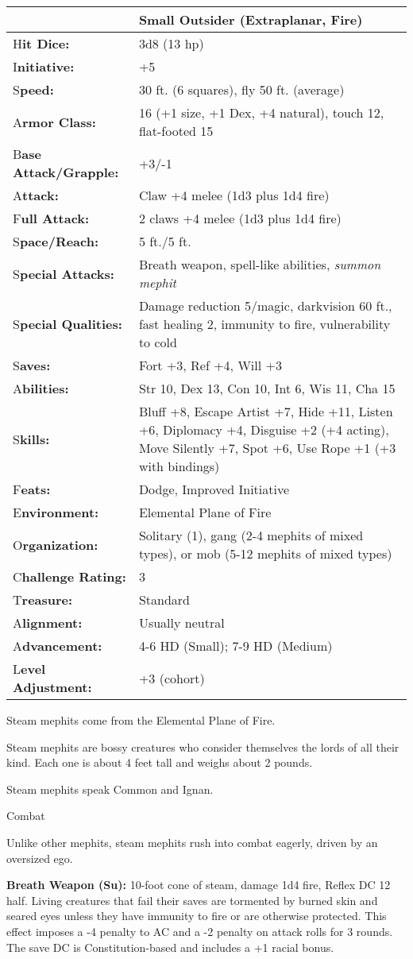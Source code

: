 \documentclass{article}
\begin{document}
\begin{tabular}{|>{\raggedright}p{90pt}|>{\raggedright}p{235pt}|}
\hline
  & Small Outsider (Extraplanar, Fire)\tabularnewline
\hline
H\textbf{it Dice:} & 3d8 (13 hp)\tabularnewline
\hline
I\textbf{nitiative:} & +5\tabularnewline
\hline
S\textbf{peed:} & 30 ft. (6 squares), fly 50 ft. (average)\tabularnewline
\hline
A\textbf{rmor Class:} & 16 (+1 size, +1 Dex, +4 natural), touch 12, flat-footed 
15\tabularnewline
\hline
B\textbf{ase Attack/Grapple:} & +3/-1\tabularnewline
\hline
A\textbf{ttack:} & Claw +4 melee (1d3 plus 1d4 fire)\tabularnewline
\hline
F\textbf{ull Attack:} & 2 claws +4 melee (1d3 plus 1d4 fire)\tabularnewline
\hline
S\textbf{pace/Reach:} & 5 ft./5 ft.\tabularnewline
\hline
S\textbf{pecial Attacks:} & Breath weapon, spell-like abilities, \textit{summon 
mephit}\tabularnewline
\hline
S\textbf{pecial Qualities:} & Damage reduction 5/magic, darkvision 60 ft., fast 
healing 2, immunity to fire, vulnerability to cold\tabularnewline
\hline
S\textbf{aves:} & Fort +3, Ref +4, Will +3\tabularnewline
\hline
A\textbf{bilities:} & Str 10, Dex 13, Con 10, Int 6, Wis 11, Cha 15\tabularnewline
\hline
S\textbf{kills:} & Bluff +8, Escape Artist +7, Hide +11, Listen +6, Diplomacy +4, 
Disguise +2 (+4 acting), Move Silently +7, Spot +6, Use Rope +1 (+3 with bindings)\tabularnewline
\hline
F\textbf{eats:} & Dodge, Improved Initiative\tabularnewline
\hline
E\textbf{nvironment:} & Elemental Plane of Fire\tabularnewline
\hline
O\textbf{rganization:} & Solitary (1), gang (2-4 mephits of mixed types), or mob 
(5-12 mephits of mixed types)\tabularnewline
\hline
C\textbf{hallenge Rating:} & 3\tabularnewline
\hline
T\textbf{reasure:} & Standard\tabularnewline
\hline
A\textbf{lignment:} & Usually neutral\tabularnewline
\hline
A\textbf{dvancement:} & 4-6 HD (Small); 7-9 HD (Medium)\tabularnewline
\hline
L\textbf{evel Adjustment:} & +3 (cohort)\tabularnewline
\hline
\end{tabular}

Steam mephits come from the Elemental Plane of Fire.

Steam mephits are bossy creatures who consider themselves the lords of all their 
kind. Each one is about 4 feet tall and weighs about 2 pounds.

Steam mephits speak Common and Ignan.

Combat

Unlike other mephits, steam mephits rush into combat eagerly, driven by an oversized 
ego.

\textbf{Breath Weapon (Su):} 10-foot cone of steam, damage 1d4 fire, Reflex DC 
12 half. Living creatures that fail their saves are tormented by burned skin and 
seared eyes unless they have immunity to fire or are otherwise protected. This 
effect imposes a -4 penalty to AC and a -2 penalty on attack rolls for 3 rounds. 
The save DC is Constitution-based and includes a +1 racial bonus.
\end{document}
